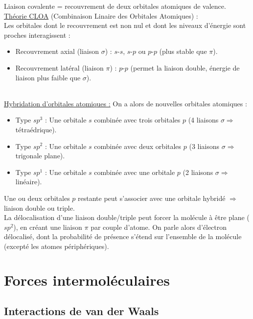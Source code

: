 \documentclass[13pt, twoside, a4paper, french, tikz]{report}
\begin{document}
    Liaison covalente = recouvrement de deux orbitales atomiques de valence.\\
    
    \underline{Théorie CLOA} (Combinaison Linaire des Orbitales Atomiques) :\\
    
    Les orbitales dont le recouvrement est non nul et dont les niveaux d'énergie sont proches interagissent :
    \begin{itemize}
      \item Recouvrement axial (liaison $\sigma$) : $s$-$s$, $s$-$p$ ou $p$-$p$ (plus stable que $\pi$).
      \item Recouvrement latéral (liaison $\pi$) : $p$-$p$ (permet la liaison double, énergie de liaison plus faible que $\sigma$).
    \end{itemize}
    \ \\
    \underline{Hybridation d'orbitales atomiques :} On a alors de nouvelles orbitales atomiques :
    \begin{itemize}
      \item Type $sp^3$ : Une orbitale $s$ combinée avec trois orbitales $p$ (4 liaisons $\sigma \Rightarrow$ tétraédrique).
      \item Type $sp^2$ : Une orbitale $s$ combinée avec deux orbitales $p$ (3 liaisons $\sigma \Rightarrow$ trigonale plane).
      \item Type $sp^1$ : Une orbitale $s$ combinée avec une orbitale $p$ (2 liaisons $\sigma \Rightarrow$ linéaire).
    \end{itemize}
    Une ou deux orbitales $p$ restante peut s'associer avec une orbitale hybridé $\Rightarrow$ liaison double ou triple.\\
    
    La délocalisation d'une liaison double/triple peut forcer la molécule à être plane ($sp^2$), en créant une liaison $\pi$ par couple d'atome.
    On parle alors d'électron délocalisé, dont la probabilité de présence s'étend sur l'ensemble de la molécule (excepté les atomes périphériques).


\chapter{Forces intermoléculaires}\label{ch:forces-intermoleculaires}
  
  
  \section{Interactions de van der Waals}\label{sec:interactions-de-van-der-waals}
    
\end{document}
